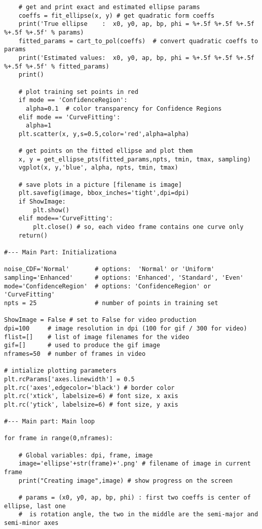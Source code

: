 \documentclass[oneside,10pt]{book}
\begin{document}
\begin{lstlisting}
    # get and print exact and estimated ellipse params
    coeffs = fit_ellipse(x, y) # get quadratic form coeffs
    print('True ellipse    :  x0, y0, ap, bp, phi = %+.5f %+.5f %+.5f %+.5f %+.5f' % params)
    fitted_params = cart_to_pol(coeffs)  # convert quadratic coeffs to params
    print('Estimated values:  x0, y0, ap, bp, phi = %+.5f %+.5f %+.5f %+.5f %+.5f' % fitted_params)
    print()

    # plot training set points in red
    if mode == 'ConfidenceRegion':
      alpha=0.1  # color transparency for Confidence Regions
    elif mode == 'CurveFitting':
      alpha=1
    plt.scatter(x, y,s=0.5,color='red',alpha=alpha)   
 
    # get points on the fitted ellipse and plot them
    x, y = get_ellipse_pts(fitted_params,npts, tmin, tmax, sampling) 
    vgplot(x, y,'blue', alpha, npts, tmin, tmax)

    # save plots in a picture [filename is image]
    plt.savefig(image, bbox_inches='tight',dpi=dpi)  
    if ShowImage:
        plt.show()
    elif mode=='CurveFitting':
        plt.close() # so, each video frame contains one curve only
    return()

#--- Main Part: Initializationa

noise_CDF='Normal'       # options:  'Normal' or 'Uniform'
sampling='Enhanced'      # options: 'Enhanced', 'Standard', 'Even'
mode='ConfidenceRegion'  # options: 'ConfidenceRegion' or 'CurveFitting' 
npts = 25                # number of points in training set

ShowImage = False # set to False for video production
dpi=100     # image resolution in dpi (100 for gif / 300 for video)
flist=[]    # list of image filenames for the video
gif=[]      # used to produce the gif image
nframes=50  # number of frames in video

# intialize plotting parameters
plt.rcParams['axes.linewidth'] = 0.5
plt.rc('axes',edgecolor='black') # border color
plt.rc('xtick', labelsize=6) # font size, x axis  
plt.rc('ytick', labelsize=6) # font size, y axis

#--- Main part: Main loop

for frame in range(0,nframes): 

    # Global variables: dpi, frame, image
    image='ellipse'+str(frame)+'.png' # filename of image in current frame
    print("Creating image",image) # show progress on the screen

    # params = (x0, y0, ap, bp, phi) : first two coeffs is center of ellipse, last one 
    #  is rotation angle, the two in the middle are the semi-major and semi-minor axes


\end{lstlisting}
\end{document}
